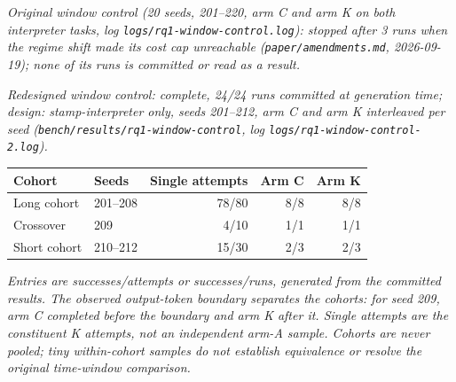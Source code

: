 \emph{Original window control (20 seeds, 201--220, arm C and arm K on both interpreter tasks, log \texttt{logs/rq1-window-control.log}): stopped after 3 runs when the regime shift made its cost cap unreachable (\texttt{paper/amendments.md}, 2026-09-19); none of its runs is committed or read as a result.}

\emph{Redesigned window control: complete, 24/24 runs committed at generation time; design: stamp-interpreter only, seeds 201--212, arm C and arm K interleaved per seed (\texttt{bench/results/rq1-window-control}, log \texttt{logs/rq1-window-control-2.log}).}

\begin{tabular}{llrrr}
\toprule
Cohort & Seeds & Single attempts & Arm C & Arm K \\
\midrule
Long cohort & 201--208 & 78/80 & 8/8 & 8/8 \\
Crossover & 209 & 4/10 & 1/1 & 1/1 \\
Short cohort & 210--212 & 15/30 & 2/3 & 2/3 \\
\bottomrule
\end{tabular}

\emph{Entries are successes/attempts or successes/runs, generated from the committed results. The observed output-token boundary separates the cohorts: for seed 209, arm C completed before the boundary and arm K after it. Single attempts are the constituent K attempts, not an independent arm-A sample. Cohorts are never pooled; tiny within-cohort samples do not establish equivalence or resolve the original time-window comparison.}
